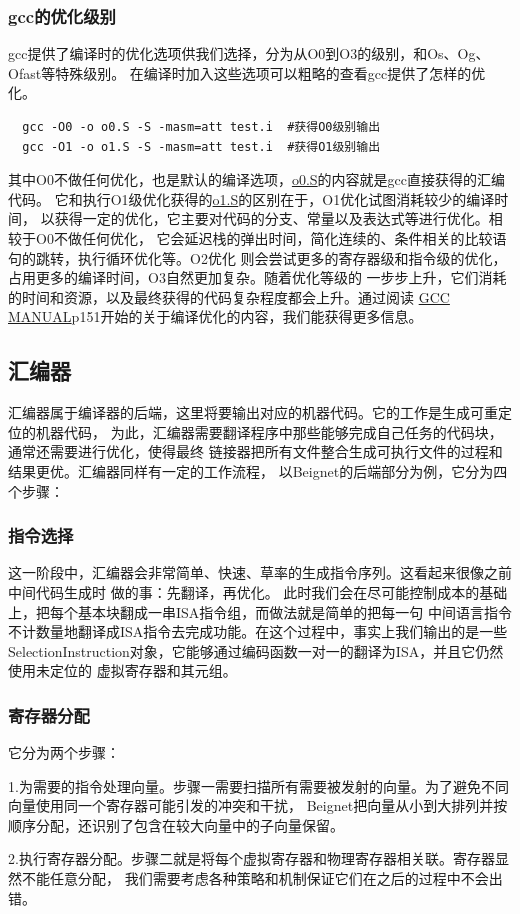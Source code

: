 \documentclass[UTF8,a4paper,10pt]{ctexart}
\begin{document}
\subsubsection{gcc的优化级别}
gcc提供了编译时的优化选项供我们选择，分为从O0到O3的级别，和Os、Og、Ofast等特殊级别。
在编译时加入这些选项可以粗略的查看gcc提供了怎样的优化。
\begin{lstlisting}
  gcc -O0 -o o0.S -S -masm=att test.i  #获得O0级别输出
  gcc -O1 -o o1.S -S -masm=att test.i  #获得O1级别输出
\end{lstlisting}
其中O0不做任何优化，也是默认的编译选项，\href{run:./test/o0.S}{o0.S}的内容就是gcc直接获得的汇编代码。
它和执行O1级优化获得的\href{run:./test/o1.S}{o1.S}的区别在于，O1优化试图消耗较少的编译时间，
以获得一定的优化，它主要对代码的分支、常量以及表达式等进行优化。相较于O0不做任何优化，
它会延迟栈的弹出时间，简化连续的、条件相关的比较语句的跳转，执行循环优化等。O2优化
则会尝试更多的寄存器级和指令级的优化，占用更多的编译时间，O3自然更加复杂。随着优化等级的
一步步上升，它们消耗的时间和资源，以及最终获得的代码复杂程度都会上升。通过阅读
\href{run:./gcc.pdf}{GCC MANUAL}p151开始的关于编译优化的内容，我们能获得更多信息。


\subsection{汇编器}
汇编器属于编译器的后端，这里将要输出对应的机器代码。它的工作是生成可重定位的机器代码，
为此，汇编器需要翻译程序中那些能够完成自己任务的代码块，通常还需要进行优化，使得最终
链接器把所有文件整合生成可执行文件的过程和结果更优。汇编器同样有一定的工作流程，
以Beignet的后端部分为例，它分为四个步骤：

\subsubsection{指令选择}
这一阶段中，汇编器会非常简单、快速、草率的生成指令序列。这看起来很像之前中间代码生成时
做的事：先翻译，再优化。
此时我们会在尽可能控制成本的基础上，把每个基本块翻成一串ISA指令组，而做法就是简单的把每一句
中间语言指令不计数量地翻译成ISA指令去完成功能。在这个过程中，事实上我们输出的是一些
SelectionInstruction对象，它能够通过编码函数一对一的翻译为ISA，并且它仍然使用未定位的
虚拟寄存器和其元组。

\subsubsection{寄存器分配}
它分为两个步骤：
\par
1.为需要的指令处理向量。步骤一需要扫描所有需要被发射的向量。为了避免不同向量使用同一个寄存器可能引发的冲突和干扰，
Beignet把向量从小到大排列并按顺序分配，还识别了包含在较大向量中的子向量保留。
\par
2.执行寄存器分配。步骤二就是将每个虚拟寄存器和物理寄存器相关联。寄存器显然不能任意分配，
我们需要考虑各种策略和机制保证它们在之后的过程中不会出错。
\end{document}
